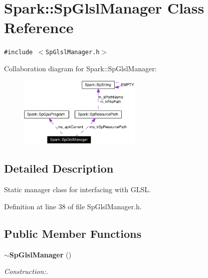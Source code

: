 \section{Spark::Sp\-Glsl\-Manager Class Reference}
\label{classSpark_1_1SpGlslManager}
{\tt \#include $<$Sp\-Glsl\-Manager.h$>$}

Collaboration diagram for Spark::Sp\-Glsl\-Manager:\begin{figure}[H]
\begin{center}
\leavevmode
\includegraphics[width=166pt]{classSpark_1_1SpGlslManager__coll__graph}
\end{center}
\end{figure}


\subsection{Detailed Description}
Static manager class for interfacing with GLSL. 

Definition at line 38 of file Sp\-Glsl\-Manager.h.\subsection*{Public Member Functions}
\begin{CompactItemize}
\item 
{\bf $\sim$Sp\-Glsl\-Manager} ()
\begin{CompactList}\small\item\em Construction:. \item\end{CompactList}\end{CompactItemize}
